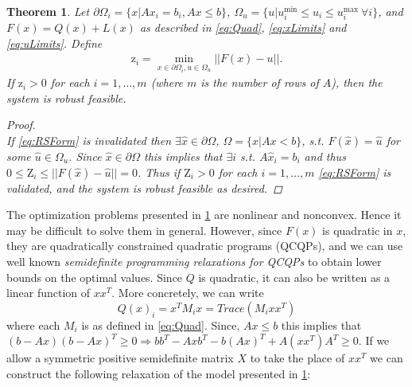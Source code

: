 \documentclass[11pt]{article}
\theoremstyle{plain}
\newtheorem{thm}{Theorem}[section]
\theoremstyle{definition}
\theoremstyle{remark}
\begin{document}
\begin{thm} \label{thm:RobFeas}
Let $\partial\Omega_i=\{x| Ax_i = b_i, Ax\leq b\}$, $\Omega_{u}=\{u| u^{\min}_i\leq u_i \leq u^{\max}_i \ \forall i \}$, and $F(x)=Q(x)+L(x)$ as described in \eqref{eq:Quad}, \eqref{eq:xLimits} and \eqref{eq:uLimits}. Define
\begin{align}
\mathrm{z}_i =  \min_{x\in\partial\Omega_i, u\in \Omega_u} ||F(x)-u||. \label{eq:OPTfeas}
\end{align}
If $\mathrm{z}_i>0$ for each $i = 1, \ldots, m$ (where $m$ is the number of rows of $A$), then the system is robust feasible.

\begin{proof} \ \\
If \eqref{eq:RSForm} is invalidated then $\exists \hat{x}\in\partial\Omega$, $\Omega=\{x| Ax< b\}$, s.t. $F(\hat{x})=\hat{u}$ for some $\hat{u}\in \Omega_u$. Since $\hat{x}\in\partial\Omega$ this implies that $\exists i$ s.t. $A\hat{x}_i=b_i$ and thus $0\leq \mathrm{Z}_i \leq ||F(\hat{x})-\hat{u}||=0$. Thus if $\mathrm{Z}_i>0$ for each $i = 1, \ldots, m$ \eqref{eq:RSForm} is validated, and the system is robust feasible as desired.
\end{proof}
\end{thm}



The optimization problems presented in \cref{thm:RobFeas} are nonlinear and nonconvex.
Hence it may be difficult to solve them in general.
However, since $F(x)$ is quadratic in $x$, they are quadratically constrained quadratic programs (QCQPs), and we can use well known \emph{semidefinite programming relaxations for QCQPs} %
to obtain lower bounds on the optimal values.
Since $Q$ is quadratic, it can also be written as a linear function of $xx^T$.
More concretely, we can write
$$Q(x)_i=x^TM_ix=Trace(M_ixx^T)$$
where each $M_i$ is as defined in \eqref{eq:Quad}. 
Since, $Ax\leq b$ this implies that $(b-Ax)(b-Ax)^T\geq 0\Rightarrow bb^T-Axb^T-b(Ax)^T+A(xx^T)A^T\geq 0$. 
If we allow a symmetric positive semidefinite matrix $X$ to take the place of $xx^T$ we can construct the following relaxation of the model presented in \cref{thm:RobFeas}:
 
\end{document}
